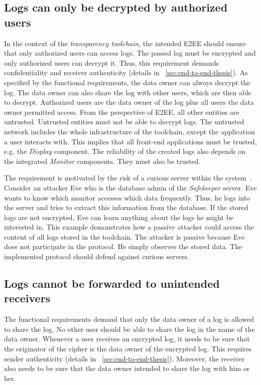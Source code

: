 \documentclass[../main.tex]{subfiles}
\begin{document}
\subsection{Logs can only be decrypted by authorized users}
In the context of the \emph{transparency toolchain}, the intended E2EE should ensure that only authorized users can access logs.
The passed log must be encrypted and only authorized users can decrypt it.
Thus, this requirement demands confidentiality and receiver authenticity (details in ~\cref{sec:end-to-end-thesis}).
As specified by the functional requirements, the data owner can always decrypt the log.
The data owner can also share the log with other users, which are then able to decrypt.
Authorized users are the data owner of the log plus all users the data owner permitted access.
From the perspective of E2EE, all other entities are untrusted.
Untrusted entities must not be able to decrypt logs.
The untrusted network includes the whole infrastructure of the toolchain, except the application a user interacts with.
This implies that all front-end applications must be trusted, e.g. the \emph{Display} component.
The reliability of the created logs also depends on the integrated \emph{Monitor} components.
They must also be trusted.

The requirement is motivated by the risk of a curious server within the system~\cite{Nabeel2017}.
Consider an attacker Eve who is the database admin of the \emph{Safekeeper} server.
Eve wants to know which monitor accesses which data frequently.
Thus, he logs into the server and tries to extract this information from the database.
If the stored logs are not encrypted, Eve can learn anything about the logs he might be interested in.
This example demonstrates how a passive attacker could access the content of all logs stored in the toolchain.
The attacker is passive because Eve does not participate in the protocol.
He simply observes the stored data.
The implemented protocol should defend against curious servers.

\subsection{Logs cannot be forwarded to unintended receivers}

The functional requirements demand that only the data owner of a log is allowed to share the log.
No other user should be able to share the log in the name of the data owner.
Whenever a user receives an encrypted log, it needs to be sure that the originator of the cipher is the data owner of the encrypted log.
This requires sender authenticity (details in ~\cref{sec:end-to-end-thesis}).
Moreover, the receiver also needs to be sure that the data owner intended to share the log with him or her.
\end{document}
